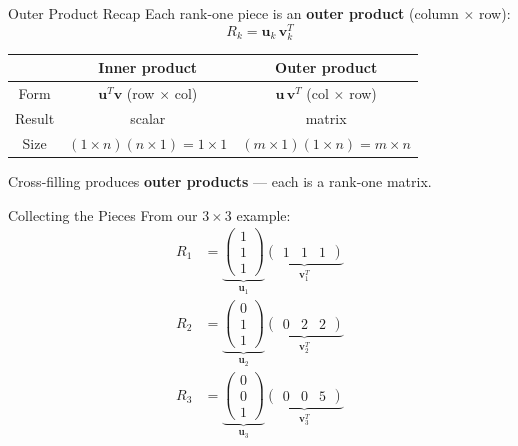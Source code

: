 \documentclass[10pt]{beamer}
\theoremstyle{definition}
\newcommand{\x}[1]{\alert{\textbf{#1}}}
\begin{document}
\begin{frame}{Outer Product Recap}
Each rank-one piece is an \x{outer product} (column $\times$ row):
$$R_k = \mathbf{u}_k \, \mathbf{v}_k^T$$

\vfill
\begin{center}
\begin{tabular}{c|c|c}
 & Inner product & Outer product \\
\hline
Form & $\mathbf{u}^T \mathbf{v}$ (row $\times$ col) & $\mathbf{u}\,\mathbf{v}^T$ (col $\times$ row) \\
Result & scalar & matrix \\
Size & $(1\!\times\! n)(n\!\times\! 1) = 1\!\times\! 1$ & $(m\!\times\! 1)(1\!\times\! n) = m\!\times\! n$
\end{tabular}
\end{center}

\vfill
Cross-filling produces \x{outer products} — each is a rank-one matrix.
\end{frame}

\begin{frame}{Collecting the Pieces}
From our $3\times 3$ example:
\begin{align*}
R_1 &= \underbrace{\begin{pmatrix} 1 \\ 1 \\ 1 \end{pmatrix}}_{\mathbf{u}_1}
\underbrace{\begin{pmatrix} 1 & 1 & 1 \end{pmatrix}}_{\mathbf{v}_1^T} \\[6pt]
R_2 &= \underbrace{\begin{pmatrix} 0 \\ 1 \\ 1 \end{pmatrix}}_{\mathbf{u}_2}
\underbrace{\begin{pmatrix} 0 & 2 & 2 \end{pmatrix}}_{\mathbf{v}_2^T} \\[6pt]
R_3 &= \underbrace{\begin{pmatrix} 0 \\ 0 \\ 1 \end{pmatrix}}_{\mathbf{u}_3}
\underbrace{\begin{pmatrix} 0 & 0 & 5 \end{pmatrix}}_{\mathbf{v}_3^T}
\end{align*}
\end{frame}
\end{document}
